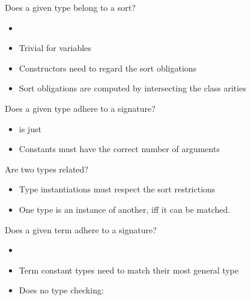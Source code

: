 \begin{frame}{Does a given type belong to a sort?}
    \begin{itemize}
        \item {} 
        \item Trivial for variables
        \item Constructors need to regard the sort obligations
        \item Sort obligations are computed by intersecting the class arities
    \end{itemize}
\end{frame}

\begin{frame}{Does a given type adhere to a signature?}
    \begin{itemize}
        \item {} is just 
        \item Constants must have the correct number of arguments
    \end{itemize}
\end{frame}

\begin{frame}{Are two types related?}
    \begin{itemize}
        \item Type instantiations must respect the sort restrictions
        \item One type is an instance of another, iff it can be matched.
    \end{itemize}
\end{frame}

\begin{frame}{Does a given term adhere to a signature?}
    \begin{itemize}
        \item {} \isa{{\isacharcolon}{\isacharcolon}} 
        \item Term constant types need to match their most general type
        \item Does no type checking:  
    \end{itemize}
\end{frame}


